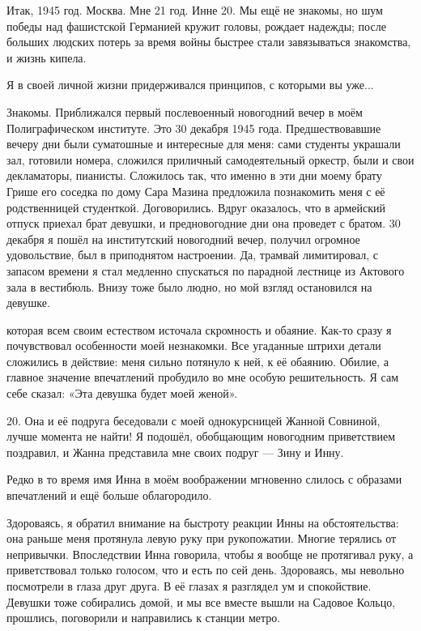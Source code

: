 Итак, 1945 год. Москва. Мне 21 год. Инне 20. Мы ещё не знакомы, но шум победы над фашистской Германией кружит головы, рождает надежды; после больших людских потерь за время войны быстрее стали завязываться знакомства, и жизнь кипела.

Я в своей личной жизни придерживался принципов, с которыми вы уже...

Знакомы.
Приближался первый послевоенный новогодний вечер в моём Полиграфическом институте. Это 30 декабря 1945 года. Предшествовавшие вечеру дни были суматошные и интересные для меня: сами студенты украшали зал, готовили номера, сложился приличный самодеятельный оркестр, были и свои декламаторы, пианисты.
Сложилось так, что именно в эти дни моему брату Грише его соседка по дому Сара Мазина предложила познакомить меня с её родственницей студенткой. Договорились. Вдруг оказалось, что в армейский отпуск приехал брат девушки, и предновогодние дни она проведет с братом.
30 декабря я пошёл на институтский новогодний вечер, получил огромное удовольствие, был в приподнятом настроении. Да, трамвай лимитировал, с запасом времени я стал медленно спускаться по парадной лестнице из Актового зала в вестибюль. Внизу тоже было людно, но мой взгляд остановился на девушке.

которая всем своим естеством источала скромность и обаяние. Как-то сразу я почувствовал особенности моей незнакомки. Все угаданные штрихи детали сложились в действие: меня сильно потянуло к ней, к её обаянию. Обилие, а главное значение впечатлений пробудило во мне особую решительность. Я сам себе сказал: «Эта девушка будет моей женой».

20. Она и её подруга беседовали с моей однокурсницей Жанной Совниной, лучше момента не найти! Я подошёл, обобщающим новогодним приветствием поздравил, и Жанна представила мне своих подруг — Зину и Инну.

Редко в то время имя Инна в моём воображении мгновенно слилось с образами впечатлений и ещё больше облагородило.

Здороваясь, я обратил внимание на быстроту реакции Инны на обстоятельства: она раньше меня протянула левую руку при рукопожатии. Многие терялись от непривычки. Впоследствии Инна говорила, чтобы я вообще не протягивал руку, а приветствовал только голосом, что и есть по сей день. Здороваясь, мы невольно посмотрели в глаза друг друга. В её глазах я разглядел ум и спокойствие. Девушки тоже собирались домой, и мы все вместе вышли на Садовое Кольцо, прошлись, поговорили и направились к станции метро.

